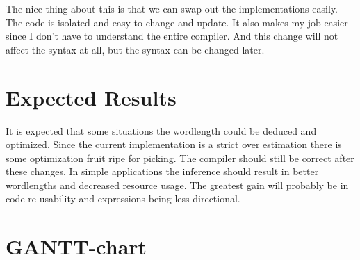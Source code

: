 \documentclass[msc,lith,english]{liuthesis}
\begin{document}
The nice thing about this is that we can swap out the implementations easily. The code is isolated and easy to change and update. It also makes my job easier since I don't have to understand the entire compiler. And this change will not affect the syntax at all, but the syntax can be changed later.

\section{Expected Results}
It is expected that some situations the wordlength could be deduced and optimized. Since the current implementation is a strict over estimation there is some optimization fruit ripe for picking. The compiler should still be correct after these changes. In simple applications the inference should result in better wordlengths and decreased resource usage. The greatest gain will probably be in code re-usability and expressions being less directional.

\newpage
\section{GANTT-chart}
\end{document}
